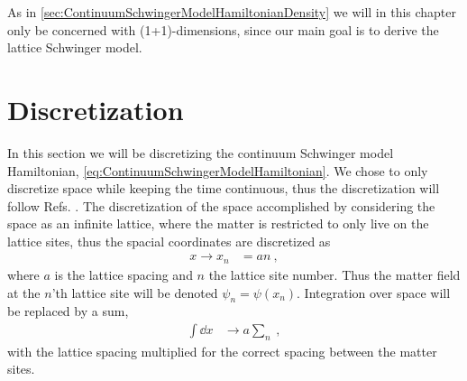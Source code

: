 \documentclass[../main.tex]{subfiles} %
\begin{document}
As in \cref{sec:ContinuumSchwingerModelHamiltonianDensity} we will in this chapter only be concerned with (1+1)-dimensions, since our main goal is to derive the lattice Schwinger model.




\section{Discretization} \label{sec:Discretization}

In this section we will be discretizing the continuum Schwinger model Hamiltonian, \cref{eq:ContinuumSchwingerModelHamiltonian}. We chose to only discretize space while keeping the time continuous, thus the discretization will follow Refs. \cite{sriganish_PhD_LatticeSchwingerModel_2001, smit_introToQuantumFieldsOnALattice_2003}. The discretization of the space accomplished by considering the space as an infinite lattice, where the matter is restricted to only live on the lattice sites, thus the spacial coordinates are discretized as
\begin{align}
    x \rightarrow x_n &= an \: ,
\end{align}
where $a$ is the lattice spacing and $n$ the lattice site number. Thus the matter field at the $n$'th lattice site will be denoted $\psi_n = \psi(x_n)$. Integration over space will be replaced by a sum,
\begin{align}
    \int \dd{x} &\rightarrow a \sum_n \: ,
\end{align}
with the lattice spacing multiplied for the correct spacing between the matter sites.
\end{document}
